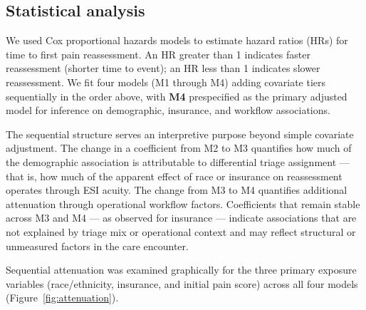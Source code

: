 \subsection{Statistical analysis}

We used Cox proportional hazards models to estimate hazard ratios (HRs) for time to first pain reassessment.
An HR greater than 1 indicates faster reassessment (shorter time to event); an HR less than 1 indicates slower reassessment.
We fit four models (M1 through M4) adding covariate tiers sequentially in the order above, with \textbf{M4} prespecified as the primary adjusted model for inference on demographic, insurance, and workflow associations.

The sequential structure serves an interpretive purpose beyond simple covariate adjustment.
The change in a coefficient from M2 to M3 quantifies how much of the demographic association is attributable to differential triage assignment --- that is, how much of the apparent effect of race or insurance on reassessment operates through ESI acuity.
The change from M3 to M4 quantifies additional attenuation through operational workflow factors.
Coefficients that remain stable across M3 and M4 --- as observed for insurance --- indicate associations that are not explained by triage mix or operational context and may reflect structural or unmeasured factors in the care encounter.

Sequential attenuation was examined graphically for the three primary exposure variables (race/ethnicity, insurance, and initial pain score) across all four models (Figure~\ref{fig:attenuation}).

